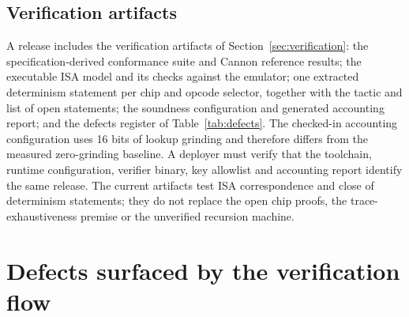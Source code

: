 \subsection{Verification artifacts}
\label{sec:ipcore-collateral}

A release includes the verification artifacts of Section~\ref{sec:verification}: the specification-derived conformance suite and Cannon reference results; the executable \Lean{} ISA model and its checks against the emulator; one extracted determinism statement per chip and opcode selector, together with the tactic and list of open statements; the soundness configuration and generated accounting report; and the defects register of Table~\ref{tab:defects}. The checked-in accounting configuration uses 16 bits of lookup grinding and therefore differs from the measured zero-grinding baseline. A deployer must verify that the toolchain, runtime configuration, verifier binary, key allowlist and accounting report identify the same release. The current artifacts test ISA correspondence and close \ndetproved{} of \ndettotal{} determinism statements; they do not replace the open chip proofs, the trace-exhaustiveness premise or the unverified recursion machine.


\section{Defects surfaced by the verification flow}
\label{sec:app-defects}

